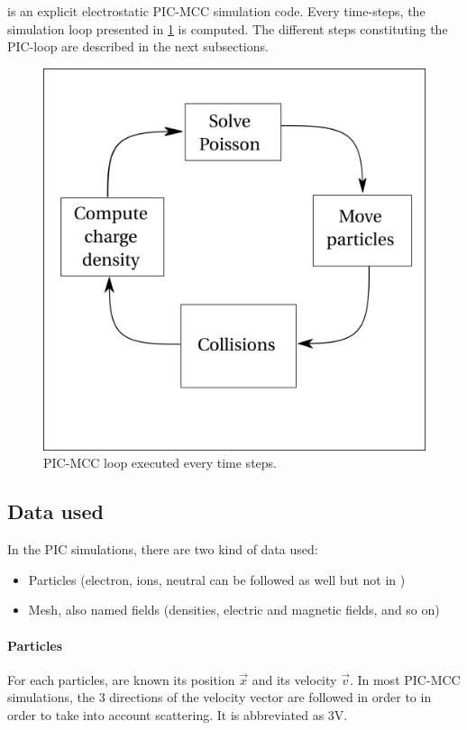   \LPPic is an explicit electrostatic \ac{PIC}-\ac{MCC} simulation code.
  Every time-steps, the simulation loop presented in \cref{fig-picloop} is computed.
  The different steps constituting the PIC-loop are described in the next subsections.
  \begin{figure}[hbtp]
    \centering
    \includegraphics{picloop.png}
    \caption{\ac{PIC}-\ac{MCC} loop executed every time steps.}
    \label{fig-picloop}
  \end{figure}

  \subsection{Data used}
    In the \ac{PIC} simulations, there are two kind of data used\string:
    \begin{itemize}
      \item Particles (electron, ions, neutral can be followed as well but not in \LPPic)
      \item Mesh, also named fields (densities, electric and magnetic fields, and so on)
    \end{itemize}

    \paragraph{Particles\\}
    For each particles, are known its position $\vec{x}$ and its velocity $\vec{v}$.
    In most \ac{PIC}-\ac{MCC} simulations, the 3 directions of the velocity vector are followed in order to in order to take into account scattering.
    It is abbreviated as \acs{3V}.
    
